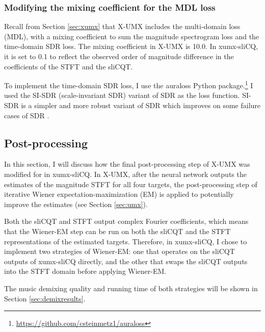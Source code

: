 \documentclass[report.tex]{subfiles}
\begin{document}
\subsubsection{Modifying the mixing coefficient for the MDL loss}
\label{sec:xumxinc}

Recall from Section \ref{sec:xumx} that X-UMX includes the multi-domain loss (MDL), with a mixing coefficient to sum the magnitude spectrogram loss and the time-domain SDR loss. The mixing coefficient in X-UMX is 10.0. In xumx-sliCQ, it is set to 0.1 to reflect the observed order of magnitude difference in the coefficients of the STFT and the sliCQT.

To implement the time-domain SDR loss, I use the auraloss Python package.\footnote{\url{https://github.com/csteinmetz1/auraloss}} I used the SI-SDR (scale-invariant SDR) \parencite{roux2018sdr} variant of SDR as the loss function. SI-SDR is a simpler and more robust variant of SDR which improves on some failure cases of SDR \parencite{roux2018sdr}.

\subsection{Post-processing}
\label{sec:postprocessing}

In this section, I will discuss how the final post-processing step of X-UMX was modified for in xumx-sliCQ. In X-UMX, after the neural network outputs the estimates of the magnitude STFT for all four targets, the post-processing step of iterative Wiener expectation-maximization (EM) is applied to potentially improve the estimates (see Section \ref{sec:umx}).

Both the sliCQT and STFT output complex Fourier coefficients, which means that the Wiener-EM step can be run on both the sliCQT and the STFT representations of the estimated targets. Therefore, in xumx-sliCQ, I chose to implement two strategies of Wiener-EM: one that operates on the sliCQT outputs of xumx-sliCQ directly, and the other that swaps the sliCQT outputs into the STFT domain before applying Wiener-EM.

The music demixing quality and running time of both strategies will be shown in Section \ref{sec:demixresults}.
\end{document}
